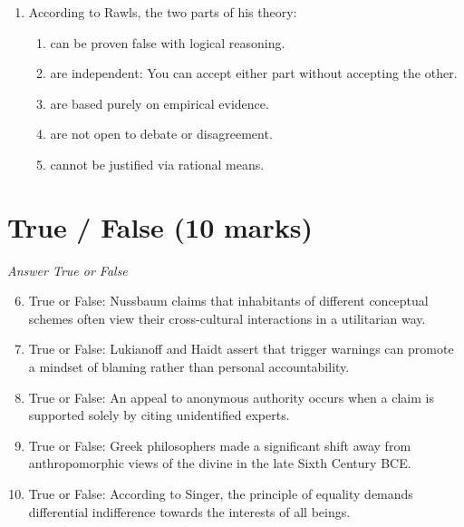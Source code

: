\documentclass[12pt]{article}
\begin{document}
\begin{enumerate}[label=\arabic*.]
\begin{enumerate}[label=(\alph*)]
    \item a way to measure the value of an action's consequences.
    \item a criterion for social acceptability.
    \item a protocol for interpersonal communication.
\end{enumerate}
\item According to Rawls, the two parts of his theory:
\begin{enumerate}[label=(\alph*)]
    \item can be proven false with logical reasoning.
    \item are independent: You can accept either part without accepting the other.
    \item are based purely on empirical evidence.
    \item are not open to debate or disagreement.
    \item cannot be justified via rational means.
\end{enumerate}
\end{enumerate}

\section*{True / False (10 marks)}
\textit{Answer True or False}
\begin{enumerate}[label=\arabic*.]
\setcounter{enumi}{5}
\item True or False: Nussbaum claims that inhabitants of different conceptual schemes often view their cross-cultural interactions in a utilitarian way.
\item True or False: Lukianoff and Haidt assert that trigger warnings can promote a mindset of blaming rather than personal accountability.
\item True or False: An appeal to anonymous authority occurs when a claim is supported solely by citing unidentified experts.
\item True or False: Greek philosophers made a significant shift away from anthropomorphic views of the divine in the late Sixth Century BCE.
\item True or False: According to Singer, the principle of equality demands differential indifference towards the interests of all beings.
\end{enumerate}
\end{document}
